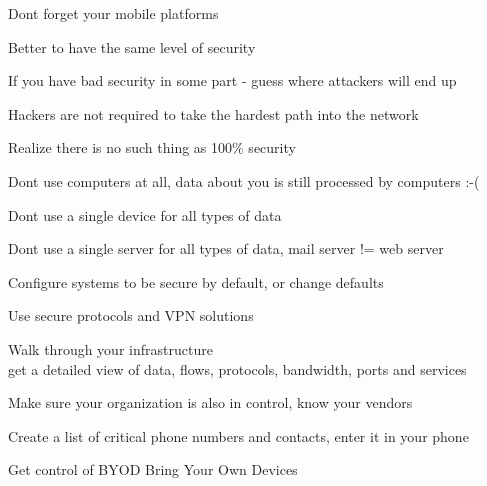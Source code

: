 \documentclass[20pt,landscape,a4paper,footrule]{foils}
\begin{document}


\centerline{Dont forget your mobile platforms }




\begin{list1}
\item Better to have the same level of security
\item If you have bad security in some part - guess where attackers will end up
\item Hackers are not required to take the hardest path into the network
\item Realize there is no such thing as 100\% security 
\end{list1}





\begin{list1}
\item Dont use computers at all, data about you is still processed by computers :-(
\item Dont use a single device for all types of data
\item Dont use a single server for all types of data, mail server != web server
\item Configure systems to be secure by default, or change defaults
\item Use secure protocols and VPN solutions
\end{list1}




\begin{list1}
\item Walk through your infrastructure\\
get a detailed view of data, flows, protocols, bandwidth, ports and services
\item Make sure your organization is also in control, know your vendors
\item Create a list of critical phone numbers and contacts, enter it in your phone
\item Get control of BYOD Bring Your Own Devices
\end{list1}
\end{document}
